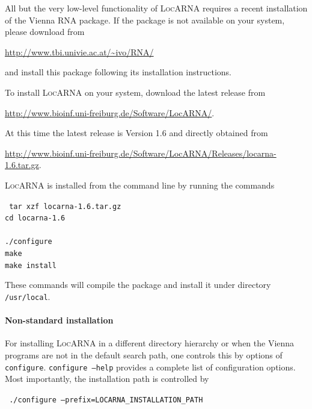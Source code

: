\documentclass{article}
\newcommand{\LocARNA}{\textsc{LocARNA}}
\newenvironment{ttbox}{%
  \begin{framed}\begin{minipage}{1.0\textwidth}\tt}%
{\end{minipage}\end{framed}\noindent}
\begin{document}
All but the very low-level functionality of \LocARNA{} requires a recent
installation of the Vienna RNA package. If the package is not
available on your system, please download from
\begin{center}
  \url{http://www.tbi.univie.ac.at/~ivo/RNA/}
\end{center}
and install this package
following its installation instructions.

To install \LocARNA{} on your system, download the latest release from
\begin{center}
  \url{http://www.bioinf.uni-freiburg.de/Software/LocARNA/}.
\end{center}
At this time the latest release is Version 1.6 and directly obtained
from
\begin{center}
  \url{http://www.bioinf.uni-freiburg.de/Software/LocARNA/Releases/locarna-1.6.tar.gz}.
\end{center}

\LocARNA{} is installed from the command line by running the commands

\begin{ttbox}
  tar xzf locarna-1.6.tar.gz\\
  cd locarna-1.6\\
  \\
  ./configure \\
  make\\
  make install\\
\end{ttbox}
These commands will compile the package and install it under directory
\texttt{/usr/local}. 

\paragraph{Non-standard installation} For installing \LocARNA{} in a
different directory hierarchy or when the Vienna programs are not in
the default search path, one controls this by options of
\texttt{configure}. \texttt{configure --help} provides a complete list
of configuration options. Most importantly, the
installation path is controlled by
\begin{ttbox}
  ./configure --prefix=LOCARNA\_INSTALLATION\_PATH
\end{ttbox}
 
\end{document}
